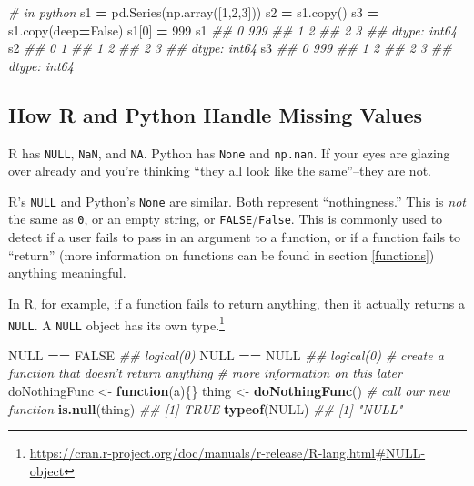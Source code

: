 \documentclass[12pt,krantz2]{krantz}
\makeatletter
\newenvironment{Shaded}{\begin{snugshade}}{\end{snugshade}}
\newcommand{\CommentTok}[1]{\textcolor[rgb]{0.37,0.37,0.37}{\textit{#1}}}
\newcommand{\ControlFlowTok}[1]{\textcolor[rgb]{0.27,0.27,0.27}{\textbf{#1}}}
\newcommand{\DecValTok}[1]{\textcolor[rgb]{0.06,0.06,0.06}{#1}}
\newcommand{\KeywordTok}[1]{\textcolor[rgb]{0.27,0.27,0.27}{\textbf{#1}}}
\newcommand{\NormalTok}[1]{#1}
\newcommand{\OperatorTok}[1]{\textcolor[rgb]{0.43,0.43,0.43}{\textbf{#1}}}
\newcommand{\OtherTok}[1]{\textcolor[rgb]{0.37,0.37,0.37}{#1}}
\newcommand{\StringTok}[1]{\textcolor[rgb]{0.5,0.5,0.5}{#1}}
\newcommand{\VariableTok}[1]{\textcolor[rgb]{0,0,0}{#1}}
\renewcommand{\href}[2]{#2\footnote{\url{#1}}}
\newenvironment{kframe}{%
\medskip{}
\setlength{\fboxsep}{.8em}
 \def\at@end@of@kframe{}%
 \ifinner\ifhmode%
  \def\at@end@of@kframe{\end{minipage}}%
  \begin{minipage}{\columnwidth}%
 \fi\fi%
 \def\FrameCommand##1{\hskip\@totalleftmargin \hskip-\fboxsep
 \colorbox{shadecolor}{##1}\hskip-\fboxsep
     \hskip-\linewidth \hskip-\@totalleftmargin \hskip\columnwidth}%
 \MakeFramed {\advance\hsize-\width
   \@totalleftmargin\z@ \linewidth\hsize
   \@setminipage}}%
 {\par\unskip\endMakeFramed%
 \at@end@of@kframe}
\renewenvironment{Shaded}{\begin{kframe}}{\end{kframe}}
\makeatother
\begin{document}
\begin{Shaded}
\begin{Highlighting}[]
\CommentTok{# in python}
\NormalTok{s1 }\OperatorTok{=}\NormalTok{ pd.Series(np.array([}\DecValTok{1}\NormalTok{,}\DecValTok{2}\NormalTok{,}\DecValTok{3}\NormalTok{]))}
\NormalTok{s2 }\OperatorTok{=}\NormalTok{ s1.copy()}
\NormalTok{s3 }\OperatorTok{=}\NormalTok{ s1.copy(deep}\OperatorTok{=}\VariableTok{False}\NormalTok{)}
\NormalTok{s1[}\DecValTok{0}\NormalTok{] }\OperatorTok{=} \DecValTok{999}
\NormalTok{s1}
\CommentTok{## 0    999}
\CommentTok{## 1      2}
\CommentTok{## 2      3}
\CommentTok{## dtype: int64}
\NormalTok{s2}
\CommentTok{## 0    1}
\CommentTok{## 1    2}
\CommentTok{## 2    3}
\CommentTok{## dtype: int64}
\NormalTok{s3}
\CommentTok{## 0    999}
\CommentTok{## 1      2}
\CommentTok{## 2      3}
\CommentTok{## dtype: int64}
\end{Highlighting}
\end{Shaded}

\hypertarget{how-r-and-python-handle-missing-values}{%
\subsection{How R and Python Handle Missing Values}\label{how-r-and-python-handle-missing-values}}

R has \texttt{NULL}, \texttt{NaN}, and \texttt{NA}. Python has \texttt{None} and \texttt{np.nan}. If your eyes are glazing over already and you're thinking ``they all look like the same''--they are not.

R's \texttt{NULL} and Python's \texttt{None} are similar. Both represent ``nothingness.'' This is \emph{not} the same as \texttt{0}, or an empty string, or \texttt{FALSE}/\texttt{False}. This is commonly used to detect if a user fails to pass in an argument to a function, or if a function fails to ``return'' (more information on functions can be found in section \ref{functions}) anything meaningful.

In R, for example, if a function fails to return anything, then it actually returns a \texttt{NULL}. \href{https://cran.r-project.org/doc/manuals/r-release/R-lang.html\#NULL-object}{A \texttt{NULL} object has its own type.}

\begin{Shaded}
\begin{Highlighting}[]
\OtherTok{NULL} \OperatorTok{==}\StringTok{ }\OtherTok{FALSE}
\CommentTok{## logical(0)}
\OtherTok{NULL} \OperatorTok{==}\StringTok{ }\OtherTok{NULL}
\CommentTok{## logical(0)}
\CommentTok{# create a function that doesn't return anything}
\CommentTok{# more information on this later}
\NormalTok{doNothingFunc <-}\StringTok{ }\ControlFlowTok{function}\NormalTok{(a)\{\} }
\NormalTok{thing <-}\StringTok{ }\KeywordTok{doNothingFunc}\NormalTok{() }\CommentTok{# call our new function}
\KeywordTok{is.null}\NormalTok{(thing)}
\CommentTok{## [1] TRUE}
\KeywordTok{typeof}\NormalTok{(}\OtherTok{NULL}\NormalTok{)}
\CommentTok{## [1] "NULL"}
\end{Highlighting}
\end{Shaded}
\end{document}
